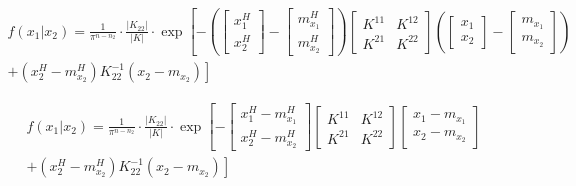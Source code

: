 \documentclass[11pt]{article}
\begin{document}
\begin{equation*}
\begin{gathered}
f(x_1|x_2)=\frac{1}{\pi^{n-n_2}}\cdot \frac{|K_{22}|}{|K|}\cdot \exp \left[
-\left(\begin{bmatrix}
x_1^H\\
x_2^H
\end{bmatrix}-
\begin{bmatrix}
m_{x_1}^H\\
m_{x_2}^H
\end{bmatrix}\right)
\begin{bmatrix}
K^{11}&K^{12}\\
K^{21}&K^{22}
\end{bmatrix}
\left(\begin{bmatrix}
x_1\\
x_2
\end{bmatrix}-
\begin{bmatrix}
m_{x_1}\\
m_{x_2}
\end{bmatrix}\right) \right. \\
\left.+(x_2^H-m_{x_2}^H)K_{22}^{-1}(x_2-m_{x_2})\right]
\end{gathered}
\end{equation*}

\begin{gather*}
f(x_1|x_2)=\frac{1}{\pi^{n-n_2}}\cdot \frac{|K_{22}|}{|K|}\cdot \exp \left[-
\begin{bmatrix}
x_1^H-m_{x_1}^H\\
x_2^H-m_{x_2}^H
\end{bmatrix}
\begin{bmatrix}
K^{11}&K^{12}\\
K^{21}&K^{22}
\end{bmatrix}
\begin{bmatrix}
x_1-m_{x_1}\\
x_2-m_{x_2}
\end{bmatrix}
\right. \\
\left.
+(x_2^H-m_{x_2}^H)K_{22}^{-1}(x_2-m_{x_2})\right]
\end{gather*}
\end{document}
